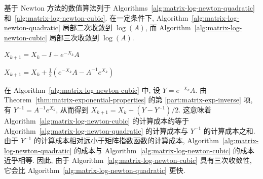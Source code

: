 {基于 Newton 方法的数值算法列于 Algorithms~\ref{alg:matrix-log-newton-quadratic} 和~\ref{alg:matrix-log-newton-cubic}. 在一定条件下, Algorithm~\ref{alg:matrix-log-newton-quadratic} 局部二次收敛到 $\log(A)$, 而 Algorithm~\ref{alg:matrix-log-newton-cubic} 局部三次收敛到 $\log(A)$.}

\begin{algorithm}[H]\caption{{求 $X=\log(A)$ 的迭代方法 1}}\label{alg:matrix-log-newton-quadratic}\begin{algorithmic}[1]
\State $X_{k+1}=X_k-I+e^{-X_k}A$
\EndFor
\end{algorithmic}\end{algorithm}

\begin{algorithm}[H]\caption{{求 $X=\log(A)$ 的迭代方法 2}}\label{alg:matrix-log-newton-cubic}\begin{algorithmic}[1]
\State $X_{k+1}=X_k+\frac{1}{2}(e^{-X_k}A-A^{-1}e^{X_k})$
\EndFor
\end{algorithmic}\end{algorithm}

{在 Algorithm~\ref{alg:matrix-log-newton-cubic} 中, 设 $Y=e^{-X_k}A$. 由 Theorem~\ref{thm:matrix-exponential-properties} 的第 \ref{part:matrix-exp-inverse} 项, 有 $Y^{-1}=A^{-1}e^{X_k}$, 从而得到 $X_{k+1}=X_k+(Y-Y^{-1})/2$. 这意味着 Algorithm~\ref{alg:matrix-log-newton-cubic} 的计算成本约等于 Algorithm~\ref{alg:matrix-log-newton-quadratic} 的计算成本与 $Y^{-1}$ 的计算成本之和. 由于 $Y^{-1}$ 的计算成本相对远小于矩阵指数函数的计算成本, Algorithm~\ref{alg:matrix-log-newton-quadratic} 的成本与 Algorithm~\ref{alg:matrix-log-newton-cubic} 的成本近乎相等. 因此, 由于 Algorithm~\ref{alg:matrix-log-newton-cubic} 具有三次收敛性, 它会比 Algorithm~\ref{alg:matrix-log-newton-quadratic} 更快.}

